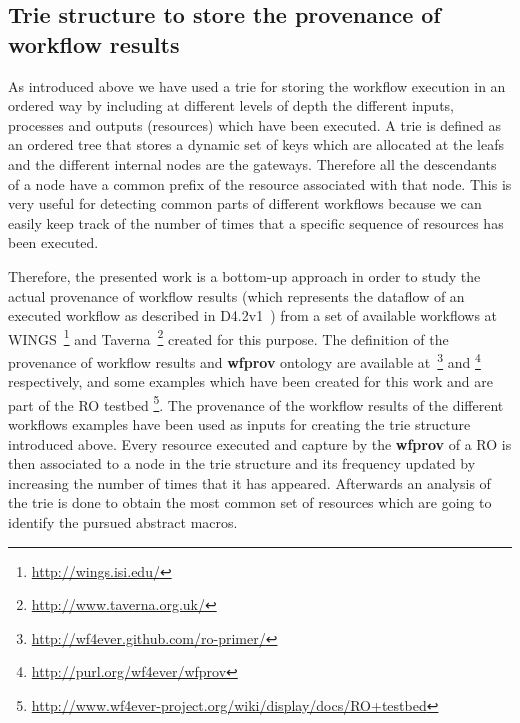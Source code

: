 \subsection{Trie structure to store the provenance of workflow results}
As introduced above we have used a trie for storing the workflow execution in an ordered way by including at different levels of depth the different inputs, processes and outputs (resources) which have been executed. A trie is defined as an ordered tree that stores a dynamic set of keys which are allocated at the leafs and the different internal nodes are the gateways. Therefore all the descendants of a node have a common prefix of the resource associated with that node. This is very useful for detecting common parts of different workflows because we can easily keep track of the number of times that a specific sequence of resources has been executed.

Therefore, the presented work is a bottom-up approach in order to study the actual provenance of workflow results (which represents the dataflow of an executed workflow as described in D4.2v1~\cite{D4.2v1}) from a set of available workflows at WINGS~\footnote{\url{http://wings.isi.edu/}} and Taverna~\footnote{\url{http://www.taverna.org.uk/}} created for this purpose. The definition of the provenance of workflow results and \textbf{wfprov} ontology are available at~\footnote{\url{http://wf4ever.github.com/ro-primer/}} and \footnote{\url{http://purl.org/wf4ever/wfprov}} respectively, and some examples which have been created for this work and are part of the RO testbed \footnote{\url{http://www.wf4ever-project.org/wiki/display/docs/RO+testbed}}. The provenance of the workflow results of the different workflows examples have been used as inputs for creating the trie structure introduced above. Every resource executed and capture by the \textbf{wfprov} of a RO is then associated to a node in the trie structure and its frequency updated by increasing the number of times that it has appeared. Afterwards an analysis of the trie is done to obtain the most common set of resources which are going to identify the pursued abstract macros. \\


